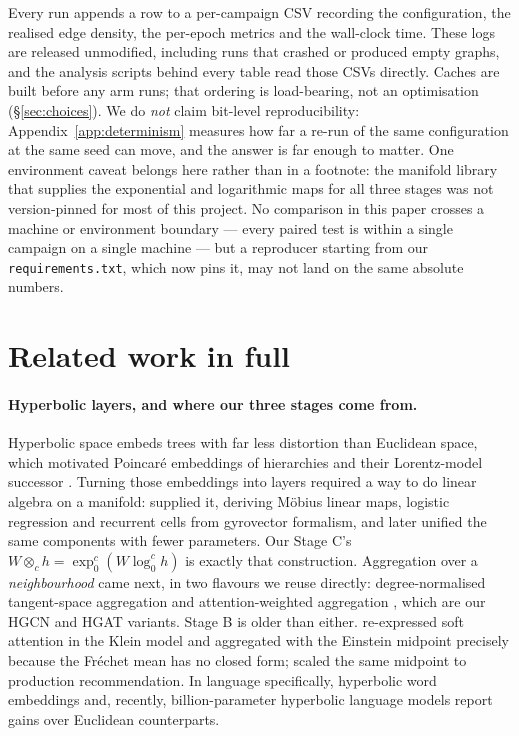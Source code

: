 \documentclass{article}
\begin{document}
Every run appends a row to a per-campaign CSV recording the configuration, the
realised edge density, the per-epoch metrics and the wall-clock time. These logs
are released unmodified, including runs that crashed or produced empty graphs,
and the analysis scripts behind every table read those CSVs directly. Caches are built before any arm runs; that
ordering is load-bearing, not an optimisation (\S\ref{sec:choices}). We do
\emph{not} claim bit-level reproducibility: Appendix~\ref{app:determinism}
measures how far a re-run of the same configuration at the same seed can move,
and the answer is far enough to matter. One environment caveat belongs here
rather than in a footnote: the manifold library that supplies the exponential
and logarithmic maps for all three stages was not version-pinned for most of
this project. No comparison in this paper crosses a machine or environment
boundary --- every paired test is within a single campaign on a single machine
--- but a reproducer starting from our \texttt{requirements.txt}, which now pins
it, may not land on the same absolute numbers.

\label{page:endprose}




\appendix
\label{page:startappendix}

\section{Related work in full}
\label{app:related}

\paragraph{Hyperbolic layers, and where our three stages come from.} Hyperbolic
space embeds trees with far less distortion than Euclidean space, which
motivated Poincar\'e embeddings of hierarchies \citep{nickel2017poincare} and
their Lorentz-model successor \citep{nickel2018lorentz}. Turning those
embeddings into layers required a way to do linear algebra on a manifold:
\citet{ganea2018hyperbolic} supplied it, deriving M\"obius linear maps,
logistic regression and recurrent cells from gyrovector formalism, and
\citet{shimizu2021hnnpp} later unified the same components with fewer
parameters. Our Stage C's $W \otimes_c h = \exp^c_0(W\log^c_0 h)$ is exactly
that construction. Aggregation over a \emph{neighbourhood} came next, in two
flavours we reuse directly: degree-normalised tangent-space aggregation
\citep{chami2019hgcn,liu2019hgnn} and attention-weighted aggregation
\citep{zhang2019hgat}, which are our HGCN and HGAT variants. Stage B is older
than either. \citet{gulcehre2018hyperbolicattention} re-expressed soft attention
in the Klein model and aggregated with the Einstein midpoint precisely because
the Fr\'echet mean has no closed form; \citet{chamberlain2019scalable} scaled
the same midpoint to production recommendation. In language specifically,
hyperbolic word embeddings \citep{tifrea2018poincareglove} and, recently,
billion-parameter hyperbolic language models \citep{he2025helm} report gains
over Euclidean counterparts.
\end{document}
